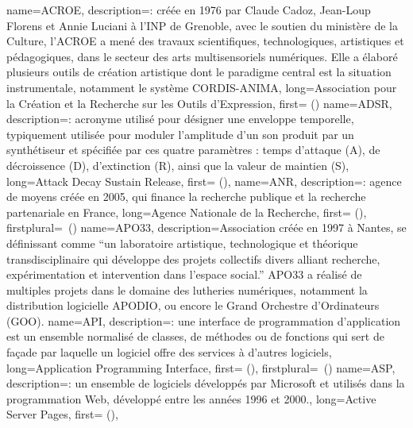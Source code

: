 {
    name={ACROE},
    description={\textit{}: créée en 1976 par Claude Cadoz, Jean-Loup Florens et Annie Luciani à l’INP de Grenoble, avec le soutien du ministère de la Culture, l'ACROE a mené des travaux scientifiques, technologiques, artistiques et pédagogiques, dans le secteur des arts multisensoriels numériques. Elle a élaboré plusieurs outils de création artistique dont le paradigme central est la situation instrumentale, notamment le système \gls{CORDIS-ANIMA}},
    long={Association pour la Création et la Recherche sur les Outils d'Expression},
    first={} ()
}
{
    name={ADSR},
    description={\textit{}: acronyme utilisé pour désigner une enveloppe temporelle, typiquement utilisée pour moduler l'amplitude d'un son produit par un synthétiseur et spécifiée par ces quatre paramètres : temps d'attaque (A), de décroissence (D), d'extinction (R), ainsi que la valeur de maintien (S)},
    long={Attack Decay Sustain Release},
    first={} (),
}
{
    name={ANR},
    description={\textit{}: agence de moyens créée en 2005, qui finance la recherche publique et la recherche partenariale en France},
    long={Agence Nationale de la Recherche},
    first={} (),
    firstplural={\glspluralsuffix\ (\glspluralsuffix)}
}
{
    name={APO33},
    description={Association créée en 1997 à Nantes, se définissant comme ``un laboratoire artistique, technologique et théorique transdisciplinaire qui développe des projets collectifs divers alliant recherche, expérimentation et intervention dans l’espace social.'' APO33 a réalisé de multiples projets dans le domaine des lutheries numériques, notamment la distribution logicielle APODIO, ou encore le Grand Orchestre d'Ordinateurs (GOO).}
}
{
    name={API},
    description={\textit{}: une interface de programmation d’application est un ensemble normalisé de classes, de méthodes ou de fonctions qui sert de façade par laquelle un logiciel offre des services à d'autres logiciels},
    long={Application Programming Interface},
    first={} (),
    firstplural={\glspluralsuffix\ (\glspluralsuffix)}
}
{
    name={ASP},
    description={\textit{}: un ensemble de logiciels développés par Microsoft et utilisés dans la programmation Web, développé entre les années 1996 et 2000.},
    long={Active Server Pages},
    first={} (),
}
